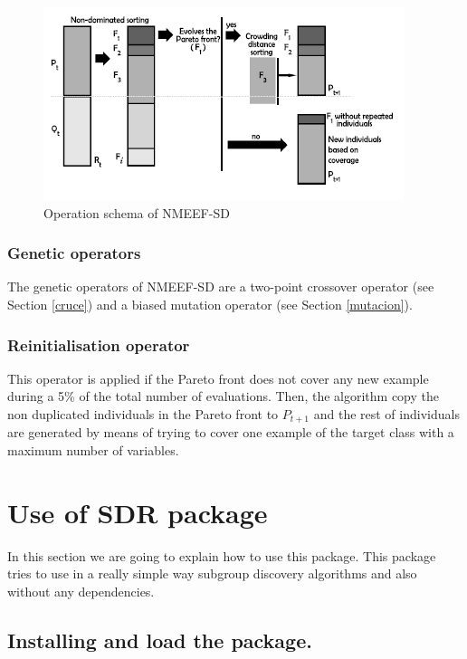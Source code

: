 \documentclass[]{article}
\begin{document}
\begin{figure}[hbtp]
  \centering
  \includegraphics{NMEEFSchema.png}
  \caption{Operation schema of NMEEF-SD}
  \label{procesoNMEEF}
\end{figure}

\subsubsection{Genetic operators}\label{genetic-operators-1}

The genetic operators of NMEEF-SD are a two-point crossover operator
(see Section \ref{cruce}) and a biased mutation operator (see Section
\ref{mutacion}).

\subsubsection{Reinitialisation
operator}\label{reinitialisation-operator}

This operator is applied if the Pareto front does not cover any new
example during a 5\% of the total number of evaluations. Then, the
algorithm copy the non duplicated individuals in the Pareto front to
$P_{t+1}$ and the rest of individuals are generated by means of trying
to cover one example of the target class with a maximum number of
variables.

\section{Use of SDR package} \label{uso}

In this section we are going to explain how to use this package. This
package tries to use in a really simple way subgroup discovery
algorithms and also without any dependencies.

\subsection{Installing and load the
package.}\label{installing-and-load-the-package.}
\end{document}

